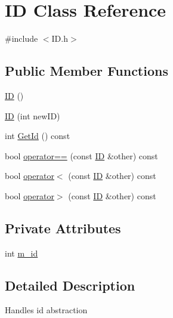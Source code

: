 \hypertarget{class_i_d}{\section{I\-D Class Reference}
\label{class_i_d}
}


{\ttfamily \#include $<$I\-D.\-h$>$}

\subsection*{Public Member Functions}
\begin{DoxyCompactItemize}
\item 
\hyperlink{class_i_d_aa2e4cc0b4fe139ee001bee463916b2d3}{I\-D} ()
\item 
\hyperlink{class_i_d_ac9148ad5f534f82b70a6ebb1a03419d6}{I\-D} (int new\-I\-D)
\item 
int \hyperlink{class_i_d_ae804d9569ccff108c70ac2047a96c17f}{Get\-Id} () const 
\item 
bool \hyperlink{class_i_d_a1851a57592cd5ecbdc281a91323aa0d0}{operator==} (const \hyperlink{class_i_d}{I\-D} \&other) const 
\item 
bool \hyperlink{class_i_d_a4a1422483f36b9798c8db73d97e72add}{operator$<$} (const \hyperlink{class_i_d}{I\-D} \&other) const 
\item 
bool \hyperlink{class_i_d_a91e5f9129f17fb22b5a20d52066d896e}{operator$>$} (const \hyperlink{class_i_d}{I\-D} \&other) const 
\end{DoxyCompactItemize}
\subsection*{Private Attributes}
\begin{DoxyCompactItemize}
\item 
int \hyperlink{class_i_d_ab5a717e6e0b00b07695a97b793ea0e44}{m\-\_\-id}
\end{DoxyCompactItemize}


\subsection{Detailed Description}
Handles id abstraction 


